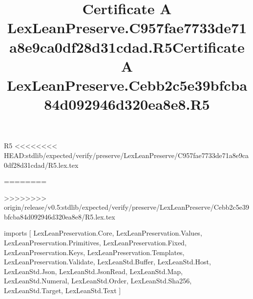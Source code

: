 \begin{lexlean}{R5}
<<<<<<<< HEAD:stdlib/expected/verify/preserve/LexLeanPreserve/C957fae7733de71a8e9ca0df28d31cdad/R5.lex.tex
\title{Certificate A LexLeanPreserve.C957fae7733de71a8e9ca0df28d31cdad.R5}
========
\title{Certificate A LexLeanPreserve.Cebb2c5e39bfcba84d092946d320ea8e8.R5}
>>>>>>>> origin/release/v0.5:stdlib/expected/verify/preserve/LexLeanPreserve/Cebb2c5e39bfcba84d092946d320ea8e8/R5.lex.tex
\begin{coremodule}
imports [
  LexLeanPreservation.Core,
  LexLeanPreservation.Values,
  LexLeanPreservation.Primitives,
  LexLeanPreservation.Fixed,
  LexLeanPreservation.Keys,
  LexLeanPreservation.Templates,
  LexLeanPreservation.Validate,
  LexLeanStd.Buffer,
  LexLeanStd.Host,
  LexLeanStd.Json,
  LexLeanStd.JsonRead,
  LexLeanStd.Map,
  LexLeanStd.Numeral,
  LexLeanStd.Order,
  LexLeanStd.Sha256,
  LexLeanStd.Target,
  LexLeanStd.Text
]


\end{coremodule}
\end{lexlean}
